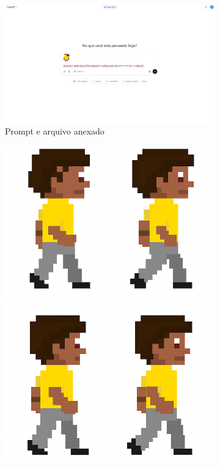 \begin{figure}[htbp]
    \centering
    \caption{\small Processo da utilização do ChatGPTem junho/2025}
    \label{fig:chatGPT4}

    \begin{subfigure}{0.75\linewidth}
        \includegraphics[width=1\linewidth]{figs/chatGPT/walking_cycle/front_view/tela.PNG}
        \caption{\small Prompt e arquivo anexado}
        \label{fig:chatGPT4a}
    \end{subfigure}
    \begin{subfigure}{0.2\linewidth}
        \includegraphics[width=1\linewidth]{figs/chatGPT/walking_cycle/front_view/walking cycle 1.png}

\end{subfigure}
\end{figure}
